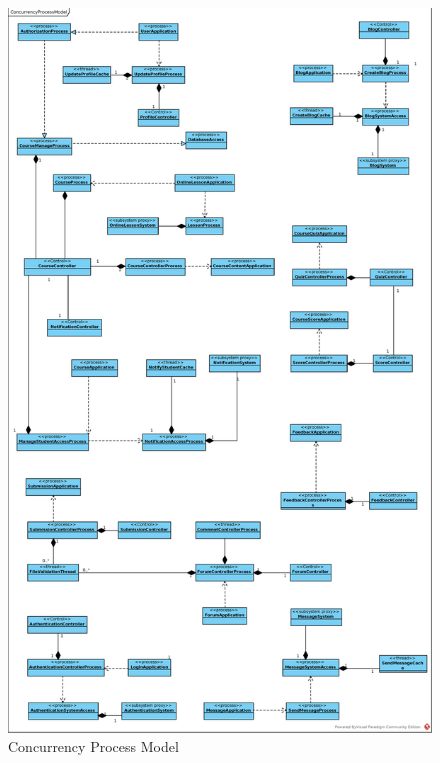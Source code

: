 \documentclass[./../main_file.tex]{subfiles}
\begin{document}
	\begin{figure}[H]
		\centering
		\includegraphics[width=0.78\linewidth]{./images/ConcurrencyProcessModel.eps}
		\caption{Concurrency Process Model}
	\end{figure}
\end{document}
